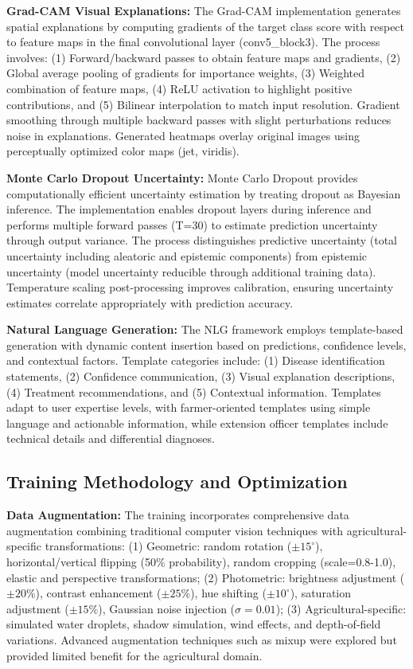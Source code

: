 \documentclass[agriculture,article,submit,pdftex,moreauthors]{Definitions/mdpi}
\begin{document}
\textbf{Grad-CAM Visual Explanations:} The Grad-CAM implementation generates spatial explanations by computing gradients of the target class score with respect to feature maps in the final convolutional layer (conv5_block3). The process involves: (1) Forward/backward passes to obtain feature maps and gradients, (2) Global average pooling of gradients for importance weights, (3) Weighted combination of feature maps, (4) ReLU activation to highlight positive contributions, and (5) Bilinear interpolation to match input resolution. Gradient smoothing through multiple backward passes with slight perturbations reduces noise in explanations. Generated heatmaps overlay original images using perceptually optimized color maps (jet, viridis).

\textbf{Monte Carlo Dropout Uncertainty:} Monte Carlo Dropout provides computationally efficient uncertainty estimation by treating dropout as Bayesian inference. The implementation enables dropout layers during inference and performs multiple forward passes (T=30) to estimate prediction uncertainty through output variance. The process distinguishes predictive uncertainty (total uncertainty including aleatoric and epistemic components) from epistemic uncertainty (model uncertainty reducible through additional training data). Temperature scaling post-processing improves calibration, ensuring uncertainty estimates correlate appropriately with prediction accuracy.

\textbf{Natural Language Generation:} The NLG framework employs template-based generation with dynamic content insertion based on predictions, confidence levels, and contextual factors. Template categories include: (1) Disease identification statements, (2) Confidence communication, (3) Visual explanation descriptions, (4) Treatment recommendations, and (5) Contextual information. Templates adapt to user expertise levels, with farmer-oriented templates using simple language and actionable information, while extension officer templates include technical details and differential diagnoses.

\subsection{Training Methodology and Optimization}

\textbf{Data Augmentation:} The training incorporates comprehensive data augmentation combining traditional computer vision techniques with agricultural-specific transformations: (1) Geometric: random rotation ($\pm 15^\circ$), horizontal/vertical flipping (50\% probability), random cropping (scale=0.8-1.0), elastic and perspective transformations; (2) Photometric: brightness adjustment ($\pm 20\%$), contrast enhancement ($\pm 25\%$), hue shifting ($\pm 10^\circ$), saturation adjustment ($\pm 15\%$), Gaussian noise injection ($\sigma = 0.01$); (3) Agricultural-specific: simulated water droplets, shadow simulation, wind effects, and depth-of-field variations. Advanced augmentation techniques such as mixup \cite{zhang2018mixup} were explored but provided limited benefit for the agricultural domain.
\end{document}
